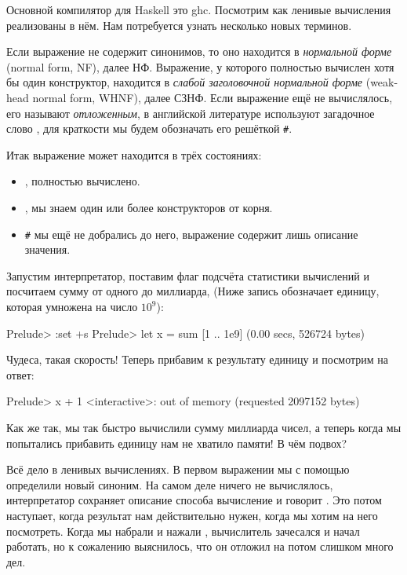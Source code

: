 Основной компилятор для Haskell это ghc. Посмотрим
как ленивые вычисления реализованы в нём.
Нам потребуется узнать несколько новых терминов.

Если выражение не содержит синонимов, то оно находится
в 
\emph{нормальной форме} (normal form, NF), далее НФ. Выражение, 
у которого полностью вычислен хотя бы один конструктор,
находится в \emph{слабой заголовочной нормальной форме}
(weak-head normal form, WHNF), далее СЗНФ. Если выражение 
ещё не вычислялось, его называют \emph{отложенным}, 
в английской литературе используют загадочное слово
, для краткости мы будем обозначать его решёткой
\verb!#!.

Итак выражение может находится в трёх состояниях:

\begin{itemize}
\item {}, полностью вычислено.
\item {}, мы знаем один или более конструкторов от корня.
\item \verb!#! мы ещё не добрались до него, выражение содержит 
    лишь описание значения.
\end{itemize}

Запустим интерпретатор, поставим флаг  подсчёта 
статистики вычислений и посчитаем сумму от одного до миллиарда,
(Ниже запись  обозначает единицу, которая умножена на число $10^9$):

\begin{code}
Prelude> :set +s
Prelude> let x = sum [1 .. 1e9]
(0.00 secs, 526724 bytes)
\end{code}

Чудеса, такая скорость! Теперь прибавим к результату единицу
и посмотрим на ответ:

\begin{code}
Prelude> x + 1
<interactive>: out of memory (requested 2097152 bytes)
\end{code}

Как же так, мы так быстро вычислили сумму 
миллиарда чисел, а теперь когда мы попытались прибавить
единицу нам не хватило памяти! В чём подвох?

Всё дело в ленивых вычислениях. В первом выражении
мы с помощью  определили новый синоним. На самом деле
ничего не вычислялось, интерпретатор сохраняет описание способа
вычисление и говорит .
Это потом наступает, когда результат нам действительно нужен,
когда мы хотим на него посмотреть. Когда мы набрали  
и нажали , вычислитель зачесался и начал работать, но 
к сожалению выяснилось, что он отложил на потом слишком много
дел. 

